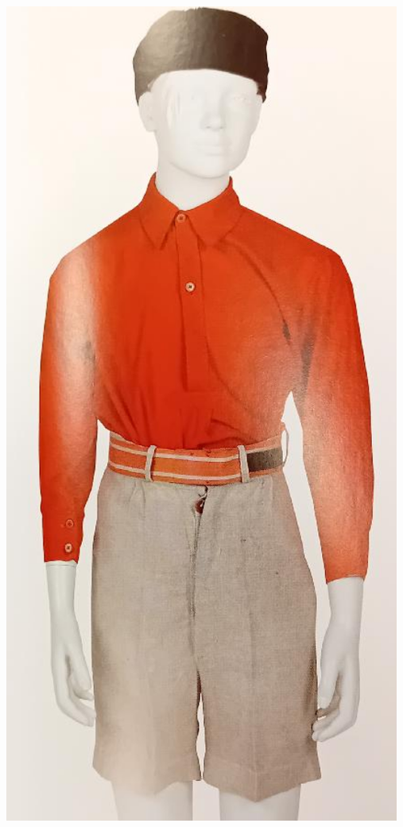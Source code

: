 \documentclass[11pt]{article}
\begin{document}
\begin{minipage}{0.3\linewidth}   
  \includegraphics[width=0.98\linewidth]{kroj_zak.png} 
\end{minipage}
\end{document}
